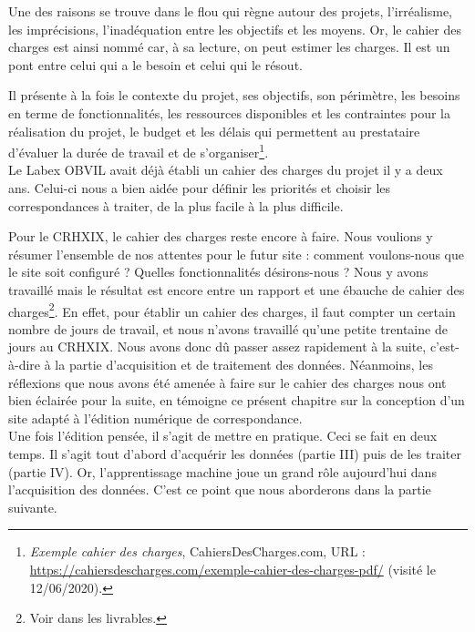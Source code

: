 Une des raisons se trouve dans le flou qui règne autour des projets, l'irréalisme, les imprécisions, l'inadéquation entre les objectifs et les moyens.
Or, le cahier des charges est ainsi nommé car, à sa lecture, on peut estimer
les charges. Il est un pont entre celui qui a le besoin et celui qui le résout. 

Il présente à la fois le contexte du projet, ses objectifs, son périmètre, les besoins en terme de fonctionnalités, les ressources disponibles et les contraintes pour la réalisation du projet, le budget et les délais qui permettent au prestataire d’évaluer la durée de travail et de s’organiser\footnote{\emph{Exemple cahier des charges}, CahiersDesCharges.com, URL : \url{https://cahiersdescharges.com/exemple-cahier-des-charges-pdf/} (visité le 12/06/2020).}.\\

Le Labex OBVIL avait déjà établi un cahier des charges du projet il y a deux ans. Celui-ci nous a bien aidée pour définir les priorités et choisir les correspondances à traiter, de la plus facile à la plus difficile.

Pour le CRHXIX, le cahier des charges reste encore à faire. Nous voulions y résumer l'ensemble de nos attentes pour le futur site : comment voulons-nous que le site soit configuré ? Quelles fonctionnalités désirons-nous ? Nous y avons travaillé mais le résultat est encore entre un rapport et une ébauche de cahier des charges\footnote{Voir dans les livrables.}. En effet, pour établir un cahier des charges, il faut compter un certain nombre de jours de travail, et nous n'avons travaillé qu'une petite trentaine de jours au CRHXIX. Nous avons donc dû passer assez rapidement à la suite, c'est-à-dire à la partie d'acquisition et de traitement des données. Néanmoins, les réflexions que nous avons été amenée à faire sur le cahier des charges nous ont bien éclairée pour la suite, en témoigne ce présent chapitre sur la conception d'un site adapté à l'édition numérique de correspondance.\\

Une fois l'édition pensée, il s'agit de mettre en pratique. Ceci se fait en deux temps. Il s'agit tout d'abord d'acquérir les données (partie III) puis de les traiter (partie IV). Or, l'apprentissage machine joue un grand rôle aujourd'hui dans l'acquisition des données. C'est ce point que nous aborderons dans la partie suivante. 

   
